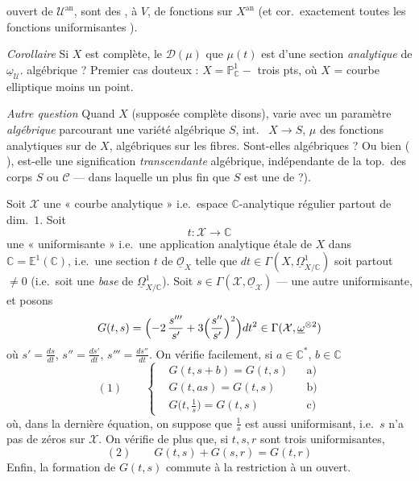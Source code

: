 \documentclass[11pt,a4paper]{article}
\begin{document}
ouvert  de $\mathcal{U}^{\mathrm{an}}$, sont des , à $V$, de fonctions  \add{\uncertain{\ill{}}} sur $X^{\mathrm{an}}$ (et \struck{\ill{}} \add{\ill{}} cor.\ exactement toutes les fonctions uniformisantes \uncertain{\ill{}}).

\emph{Corollaire} Si $X$ est \uncertain{\ill{}} complète, \ill{} le \ill{} \ill{}  $\mathcal{D}(\mu)$  que $\mu(t)$ est  d'une section \emph{analytique} de $\underline{\omega}_{\mathcal{U}}$. \struck{\ill{} \ill{}}  algébrique ? Premier cas douteux : $X=\mathbb{P}^1_{\mathbb{C}}-$ trois pts, où $X$ = courbe elliptique moins un point.

\emph{Autre question} Quand $X$ (supposée complète disons), varie avec un paramètre \emph{algébrique} parcourant une variété algébrique $S$, int.\ \ill{} $X\to S$,   $\mu$ des fonctions analytiques sur \ill{} de $X$, algébriques sur les fibres. Sont-elles algébriques ? Ou bien ( ), est-elle une signification \emph{transcendante} algébrique, indépendante de la top.\ des corps \ill{} $S$ ou $\mathcal{C}$ — dans laquelle un \ill{} plus fin que $S$ est une  \ill{} de \ill{}  ?).

Soit $\mathcal{X}$ une « courbe analytique » i.e.\ espace $\mathbb{C}$-analytique régulier partout de dim.\ $1$. Soit
\[
t:\mathcal{X}\to\mathbb{C}
\]
une « uniformisante » i.e.\ une application analytique étale de $X$ dans $\mathbb{C}=\mathbb{E}^1(\mathbb{C})$, i.e.\ une section $t$ de $\underline{\mathcal{O}}_X$ telle que $dt\in\Gamma(X,\underline{\Omega}^1_{X/\mathbb{C}})$ soit partout $\neq0$ (i.e.\ soit une \emph{base} de $\underline{\Omega}^1_{X/\mathbb{C}}$). Soit $s\in\Gamma(\mathcal{X},\underline{\mathcal{O}}_{\mathcal{X}})$ — \struck{\ill{}} une autre uniformisante, et posons
\[
G(t,s)=\Bigl(-2\,\frac{s'''}{s'}+3\Bigl(\frac{s''}{s'}\Bigr)^2\Bigr)dt^2\in\Gamma(\mathcal{X},\underline{\omega}^{\otimes2})
\]
où $s'=\frac{ds}{dt}$, $s''=\frac{ds'}{dt}$, $s'''=\frac{ds''}{dt}$. On \struck{\ill{}} vérifie facilement, si $a\in\mathbb{C}^*$, $b\in\mathbb{C}$ 
\[
(1)\qquad
\left\{
\begin{aligned}
&G(t,s+b)=G(t,s) &&\text{a)}\\
&G(t,as)=G(t,s) &&\text{b)}\\
&G\bigl(t,\tfrac1s\bigr)=G(t,s) &&\text{c)}
\end{aligned}
\right.
\]
où, dans la dernière équation, on suppose que $\frac1s$ est aussi uniformisant, i.e.\ $s$ n'a pas de zéros sur $\mathcal{X}$. On vérifie de plus que, si $t,s,r$ sont trois uniformisantes,
\[
(2)\qquad G(t,s)+G(s,r)=G(t,r)
\]
Enfin,  la formation de $G(t,s)$ commute à la restriction à un ouvert. 
\end{document}
